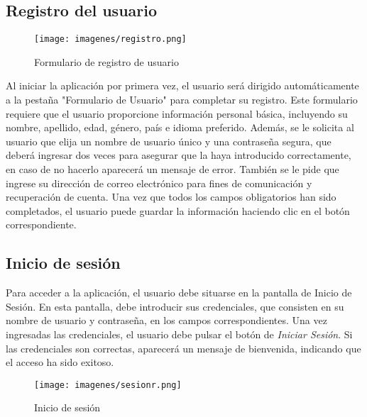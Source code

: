 \documentclass[a4paper,12pt,twoside]{memoir}
\begin{document}
 \subsection{Registro del usuario}
 \begin{figure}
        \centering
        \texttt{[image: imagenes/registro.png]} 
        \caption{Formulario de registro de usuario}
        \label{fig:ejemplo}
    \end{figure}
 Al iniciar la aplicación por primera vez, el usuario será dirigido automáticamente a la pestaña "Formulario de Usuario" para completar su registro. Este formulario requiere que el usuario proporcione información personal básica, incluyendo su nombre, apellido, edad, género, país e idioma preferido. Además, se le solicita al usuario que elija un nombre de usuario único y una contraseña segura, que deberá ingresar dos veces para asegurar que la haya introducido correctamente, en caso de no hacerlo aparecerá un mensaje de error. También se le pide que ingrese su dirección de correo electrónico para fines de comunicación y recuperación de cuenta. Una vez que todos los campos obligatorios han sido completados, el usuario puede guardar la información haciendo clic en el botón correspondiente.


 \subsection{Inicio de sesión}

 Para acceder a la aplicación, el usuario debe situarse en la pantalla de Inicio de Sesión. En esta pantalla, debe introducir sus credenciales, que consisten en su nombre de usuario y contraseña, en los campos correspondientes. Una vez ingresadas las credenciales, el usuario debe pulsar el botón de \textit{Iniciar Sesión}. Si las credenciales son correctas, aparecerá un mensaje de bienvenida, indicando que el acceso ha sido exitoso.

 \begin{figure}
    \centering
    \texttt{[image: imagenes/sesionr.png]}
    \caption{Inicio de sesión}
    \label{fig:enter-label}
\end{figure}
 
\end{document}
